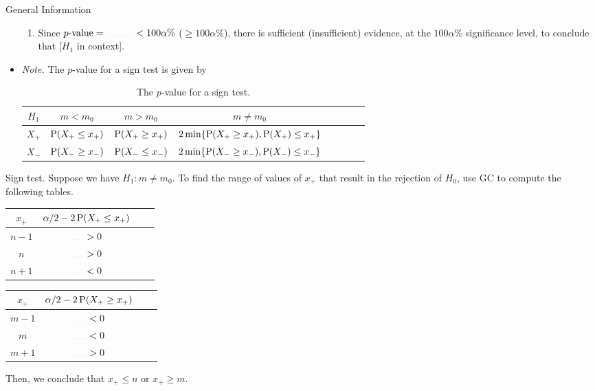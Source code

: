\documentclass[../Notes.tex]{subfiles}
\begin{document}
\begin{stbox}{General Information}
\begin{itemize}
\begin{enumerate}
      \item Since \(p\text{-value}=\rule{1cm}{0.01mm}<100\alpha\%\) (\(\geq 100\alpha\%\)), there is sufficient (insufficient) evidence, at the \(100\alpha\%\) significance level, to conclude that [\(H_1\) in context].
    \end{enumerate}
    \item \emph{Note.} The \(p\)-value for a sign test is given by
    \begin{table}[H]
      \centering
      \begin{tabular}{ScScScSc}
        \toprule
        \(H_1\) & \(m<m_0\) & \(m>m_0\) & \(m\neq m_0\)\\
        \midrule
        \(X_{+}\) & \(\operatorname{P}(X_{+}\leq x_{+})\) & \(\operatorname{P}(X_{+}\geq x_{+})\) & \(2\min\{\operatorname{P}(X_{+}\geq x_{+}),\operatorname{P}(X_{+})\leq x_{+}\}\)\\
        \midrule
        \(X_{-}\) & \(\operatorname{P}(X_{-}\geq x_{-})\) & \(\operatorname{P}(X_{-}\leq x_{-})\) & \(2\min\{\operatorname{P}(X_{-}\geq x_{-}),\operatorname{P}(X_{-})\leq x_{-}\}\)\\
        \bottomrule
      \end{tabular}
      \caption{The \(p\)-value for a sign test.}
      \label{table:sign-test-p-value}
    \end{table}
  \end{itemize}
\end{stbox}
\begin{note}
  Sign test. Suppose we have \(H_1\colon m\neq m_0\). To find the range of values of \(x_{+}\) that result in the rejection of \(H_0\), use GC to compute the following tables.
  \begin{table}[H]
    \centering
    \begin{tabular}{|Sc|Sc|}
      \hline
      \(x_{+}\) & \(\alpha/2-2\operatorname{P}(X_{+}\leq x_{+})\)\\
      \hline
      \(n-1\) & \(\rule{0.5cm}{0.01mm}>0\)\\
      \hline
      \(n\) & \(\rule{0.5cm}{0.01mm}>0\)\\
      \hline
      \(n+1\) & \(\rule{0.5cm}{0.01mm}<0\)\\
      \hline
    \end{tabular}\hspace{1cm}
    \begin{tabular}{|Sc|Sc|}
      \hline
      \(x_{+}\) & \(\alpha/2-2\operatorname{P}(X_{+}\geq x_{+})\)\\
      \hline
      \(m-1\) & \(\rule{0.5cm}{0.01mm}<0\)\\
      \hline
      \(m\) & \(\rule{0.5cm}{0.01mm}<0\)\\
      \hline
      \(m+1\) & \(\rule{0.5cm}{0.01mm}>0\)\\
      \hline
    \end{tabular} 
  \end{table}
  Then, we conclude that \(x_{+}\leq n\) or \(x_{+}\geq m\).
\end{note}
\end{document}
